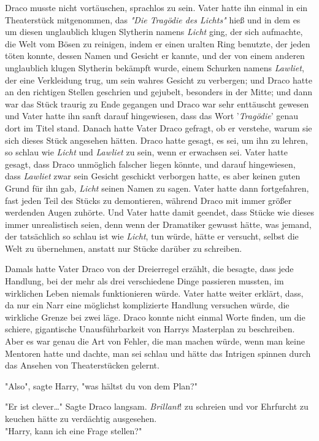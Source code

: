 {Draco musste nicht vortäuschen, sprachlos zu sein. Vater hatte ihn einmal in ein Theaterstück mitgenommen, das \emph{"Die Tragödie des Lichts"} hieß und in dem es um diesen unglaublich klugen Slytherin namens \emph{Licht} ging, der sich aufmachte, die Welt vom Bösen zu reinigen, indem er einen uralten Ring benutzte, der jeden töten konnte, dessen Namen und Gesicht er kannte, und der von einem anderen unglaublich klugen Slytherin bekämpft wurde, einem Schurken namens \emph{Lawliet}, der eine Verkleidung trug, um sein wahres Gesicht zu verbergen; und Draco hatte an den richtigen Stellen geschrien und gejubelt, besonders in der Mitte; und dann war das Stück traurig zu Ende gegangen und Draco war sehr enttäuscht gewesen und Vater hatte ihn sanft darauf hingewiesen, dass das Wort '\emph{Tragödie}' genau dort im Titel stand. Danach hatte Vater Draco gefragt, ob er verstehe, warum sie sich dieses Stück angesehen hätten. Draco hatte gesagt, es sei, um ihn zu lehren, so schlau wie \emph{Licht} und \emph{Lawliet} zu sein, wenn er erwachsen sei. Vater hatte gesagt, dass Draco unmöglich falscher liegen könnte, und darauf hingewiesen, dass \emph{Lawliet} zwar sein Gesicht geschickt verborgen hatte, es aber keinen guten Grund für ihn gab, \emph{Licht} seinen Namen zu sagen. Vater hatte dann fortgefahren, fast jeden Teil des Stücks zu demontieren, während Draco mit immer größer werdenden Augen zuhörte. Und Vater hatte damit geendet, dass Stücke wie dieses immer unrealistisch seien, denn wenn der Dramatiker gewusst hätte, was jemand, der tatsächlich so schlau ist wie \emph{Licht}, tun würde, hätte er versucht, selbst die Welt zu übernehmen, anstatt nur Stücke darüber zu schreiben.

Damals hatte Vater Draco von der Dreierregel erzählt, die besagte, dass jede Handlung, bei der mehr als drei verschiedene Dinge passieren mussten, im wirklichen Leben niemals funktionieren würde. Vater hatte weiter erklärt, dass, da nur ein Narr eine möglichst komplizierte Handlung versuchen würde, die wirkliche Grenze bei zwei läge. Draco konnte nicht einmal Worte finden, um die schiere, gigantische Unausführbarkeit von Harrys Masterplan zu beschreiben. Aber es war genau die Art von Fehler, die man machen würde, wenn man keine Mentoren hatte und dachte, man sei schlau und hätte das Intrigen spinnen durch das Ansehen von Theaterstücken gelernt.

"Also", sagte Harry, "was hältst du von dem Plan?"

"Er ist clever…" Sagte Draco langsam. \emph{Brillant}! zu schreien und vor Ehrfurcht zu keuchen hätte zu verdächtig ausgesehen.\\ "Harry, kann ich eine Frage stellen?"

}
